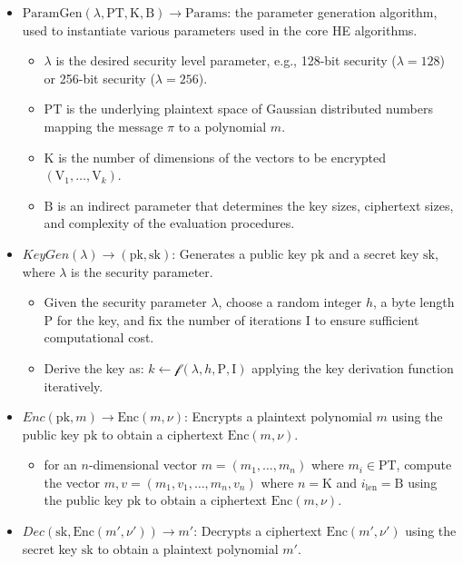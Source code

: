 \documentclass{article}
\begin{document}
\begin{itemize}
    \item \(\text{ParamGen}(\lambda, \text{PT}, \text{K}, \text{B}) \rightarrow \text{Params}\): the parameter generation algorithm, used to instantiate various parameters used in the core HE algorithms.
    \begin{itemize}
        \item \(\lambda\) is the desired security level parameter, e.g., 128-bit security (\(\lambda = 128\)) or 256-bit security (\(\lambda = 256\)).
        \item \(\text{PT}\) is the underlying plaintext space of Gaussian distributed numbers mapping the message \(\pi\) to a polynomial \(m\).
        \item \(\text{K}\) is the number of dimensions of the vectors to be encrypted \((\text{V}_1, \ldots, \text{V}_k)\).
        \item \(\text{B}\) is an indirect parameter that determines the key sizes, ciphertext sizes, and complexity of the evaluation procedures.
    \end{itemize}
    
    \item \(KeyGen(\lambda) \rightarrow (\text{pk}, \text{sk})\): Generates a public key \(\text{pk}\) and a secret key \(\text{sk}\), where \(\lambda\) is the security parameter.
    \begin{itemize}
        \item Given the security parameter \(\lambda\), choose a random integer \(h\), a byte length \(\text{P}\) for the key, and fix the number of iterations \(\text{I}\) to ensure sufficient computational cost.
        \item Derive the key as: \(k \leftarrow \mathcal{f}(\lambda, h, \text{P}, \text{I})\) applying the key derivation function iteratively.
    \end{itemize}
    
    \item \(Enc(\text{pk}, m) \rightarrow \text{Enc}(m, \nu)\): Encrypts a plaintext polynomial \(m\) using the public key \(\text{pk}\) to obtain a ciphertext \(\text{Enc}(m, \nu)\).
    \begin{itemize}
        \item for an \(n\)-dimensional vector \(m = (m_1, \ldots, m_n)\) where \(m_i \in \text{PT}\), compute the vector \(m, v = (m_1, v_1, \ldots, m_n, v_n)\) where \(n = \text{K}\) and \(i_{\text{len}} = \text{B}\) using the public key \(\text{pk}\) to obtain a ciphertext \(\text{Enc}(m, \nu)\).
    \end{itemize}
    
    \item \(Dec(\text{sk}, \text{Enc}(m', \nu')) \rightarrow m'\): Decrypts a ciphertext \(\text{Enc}(m', \nu')\) using the secret key \(\text{sk}\) to obtain a plaintext polynomial \(m'\).
\end{itemize}
\end{document}
